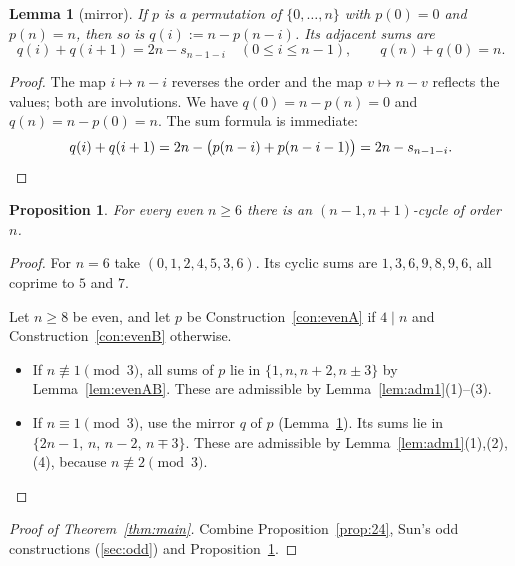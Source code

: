 \documentclass[11pt]{article}
\numberwithin{equation}{section}
\newtheorem{proposition}[theorem]{Proposition}
\newtheorem{lemma}[theorem]{Lemma}
\theoremstyle{definition}
\theoremstyle{remark}
\begin{document}
\begin{lemma}[mirror]\label{lem:mirror}
If $p$ is a permutation of $\{0,\dots,n\}$ with $p(0)=0$ and $p(n)=n$, then so is
$q(i):=n-p(n-i)$. Its adjacent sums are
\[
q(i)+q(i+1)=2n-s_{n-1-i}\quad(0\le i\le n-1),\qquad q(n)+q(0)=n .
\]
\end{lemma}
\begin{proof}
The map $i\mapsto n-i$ reverses the order and the map $v\mapsto n-v$ reflects the values; both are
involutions. We have $q(0)=n-p(n)=0$ and $q(n)=n-p(0)=n$. The sum formula is immediate:
\[
q(i)+q(i+1)=2n-\big(p(n-i)+p(n-i-1)\big)=2n-s_{n-1-i}. \qedhere
\]
\end{proof}

\begin{proposition}\label{prop:even}
For every even $n\ge6$ there is an $(n-1,n+1)$-cycle of order $n$.
\end{proposition}
\begin{proof}
For $n=6$ take $(0,1,2,4,5,3,6)$. Its cyclic sums are $1,3,6,9,8,9,6$, all coprime to $5$ and $7$.

Let $n\ge8$ be even, and let $p$ be Construction~\ref{con:evenA} if $4\mid n$ and Construction~\ref{con:evenB} otherwise.
\begin{itemize}
  \item If $n\not\equiv1\pmod3$, all sums of $p$ lie in $\{1,n,n+2,n\pm3\}$ by Lemma~\ref{lem:evenAB}.
  These are admissible by Lemma~\ref{lem:adm1}(1)--(3).
  \item If $n\equiv1\pmod3$, use the mirror $q$ of $p$ (Lemma~\ref{lem:mirror}). Its sums lie in
  $\{2n-1,\,n,\,n-2,\,n\mp3\}$. These are admissible by Lemma~\ref{lem:adm1}(1),(2),(4), because
  $n\not\equiv2\pmod 3$. \qedhere
\end{itemize}
\end{proof}

\begin{proof}[Proof of Theorem~\ref{thm:main}]
Combine Proposition~\ref{prop:24}, Sun's odd constructions (\cref{sec:odd}) and Proposition~\ref{prop:even}.
\end{proof}
\end{document}
